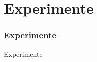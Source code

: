 \section[Experimente]{Experimente}
\begin{frame}[<+->]
\frametitle{Experimente}
    
    Experimente

\end{frame}